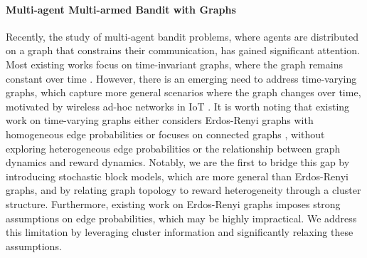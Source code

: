 \paragraph{Multi-agent Multi-armed Bandit with Graphs} 
Recently, the study of multi-agent bandit problems, where agents are distributed on a graph that constrains their communication, has gained significant attention. Most existing works focus on time-invariant graphs, where the graph remains constant over time \citep{wang2021multitask, jiang2023multi, zhu2020distributed,zhu2021decentralized,zhu2021federated}. However, there is an emerging need to address time-varying graphs, which capture more general scenarios where the graph changes over time, motivated by wireless ad-hoc networks in IoT \citep{roman2013features}. It is worth noting that existing work on time-varying graphs either considers Erdos-Renyi graphs with homogeneous edge probabilities \citep{xu2023decentralized} or focuses on connected graphs \citep{zhu2023distributed}, without exploring heterogeneous edge probabilities or the relationship between graph dynamics and reward dynamics. Notably, we are the first to bridge this gap by introducing stochastic block models, which are more general than Erdos-Renyi graphs, and by relating graph topology to reward heterogeneity through a cluster structure. Furthermore, existing work on Erdos-Renyi graphs \citep{xu2023decentralized} imposes strong assumptions on edge probabilities, which may be highly impractical. We address this limitation by leveraging cluster information and significantly relaxing these assumptions.


